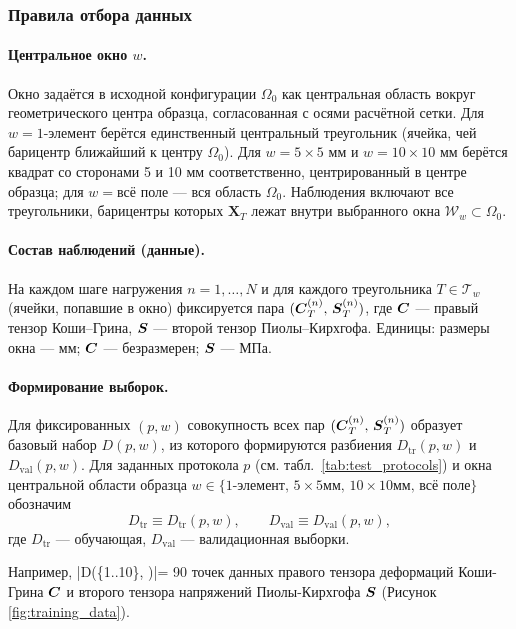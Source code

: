 \subsubsection{Правила отбора данных}
\paragraph{Центральное окно $w$.}
Окно задаётся в исходной конфигурации $\Omega_0$ как центральная область вокруг геометрического центра образца, согласованная с осями расчётной сетки.
Для $w=\text{1-элемент}$ берётся единственный центральный треугольник (ячейка, чей барицентр ближайший к центру $\Omega_0$).
Для $w=5\times5$ мм и $w=10\times10$ мм берётся квадрат со сторонами 5 и 10 мм соответственно, центрированный в центре образца; для $w=\text{всё поле}$ — вся область $\Omega_0$.
Наблюдения включают все треугольники, барицентры которых $\mathbf{X}_T$ лежат внутри выбранного окна $\mathcal{W}_w\subset\Omega_0$.

\paragraph{Состав наблюдений (данные).}
На каждом шаге нагружения $n=1,\dots,N$ и для каждого треугольника $T\in\mathcal{T}_w$ (ячейки, попавшие в окно) фиксируется пара $(\boldsymbol{C}_T^{(n)},\,\boldsymbol{S}_T^{(n)})$, 
где $\boldsymbol{C}$ — правый тензор Коши–Грина, $\boldsymbol{S}$ — второй тензор Пиолы–Кирхгофа.
Единицы: размеры окна — мм; $\boldsymbol{C}$ — безразмерен; $\boldsymbol{S}$ — МПа.

\paragraph{Формирование выборок.}
Для фиксированных $(p,w)$ совокупность всех пар $(\boldsymbol{C}_T^{(n)},\,\boldsymbol{S}_T^{(n)})$ образует базовый набор $D(p,w)$, из которого формируются разбиения $D_{\mathrm{tr}}(p,w)$ и $D_{\mathrm{val}}(p,w)$.
Для заданных протокола $p$ (см. табл.~\ref{tab:test_protocols}) 
и окна центральной области образца 
$w\in\{\text{1-элемент},\,5\times5 мм,\,10\times10 мм,\,\text{всё поле}\}$ обозначим
\[
  D_{\mathrm{tr}}\equiv D_{\mathrm{tr}}(p,w),\qquad D_{\mathrm{val}}\equiv D_{\mathrm{val}}(p,w),
\]
где $D_{\mathrm{tr}}$ — обучающая, $D_{\mathrm{val}}$ — валидационная выборки.


Например, |D(\{1..10\}, )|= 90 точек данных правого тензора деформаций Коши-Грина $\boldsymbol{C}$ 
и второго тензора напряжений Пиолы-Кирхгофа $\boldsymbol{S}$ (Рисунок \ref{fig:training_data}).


